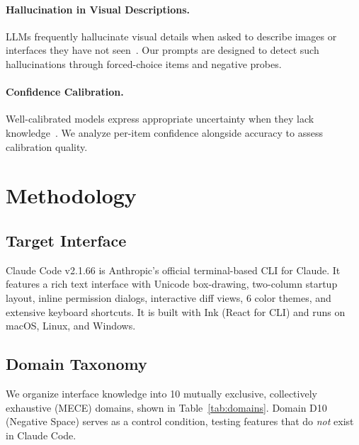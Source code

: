 \documentclass[10pt,twocolumn]{article}
\begin{document}
\paragraph{Hallucination in Visual Descriptions.}
LLMs frequently hallucinate visual details when asked to describe images or interfaces they have not seen~\citep{ji2023survey}.
Our prompts are designed to detect such hallucinations through forced-choice items and negative probes.

\paragraph{Confidence Calibration.}
Well-calibrated models express appropriate uncertainty when they lack knowledge~\citep{guo2017calibration}.
We analyze per-item confidence alongside accuracy to assess calibration quality.

\section{Methodology}

\subsection{Target Interface}
Claude Code v2.1.66 is Anthropic's official terminal-based CLI for Claude.
It features a rich text interface with Unicode box-drawing, two-column startup layout, inline permission dialogs, interactive diff views, 6 color themes, and extensive keyboard shortcuts.
It is built with Ink (React for CLI) and runs on macOS, Linux, and Windows.

\subsection{Domain Taxonomy}
We organize interface knowledge into 10 mutually exclusive, collectively exhaustive (MECE) domains, shown in Table~\ref{tab:domains}.
Domain D10 (Negative Space) serves as a control condition, testing features that do \textit{not} exist in Claude Code.
\end{document}
